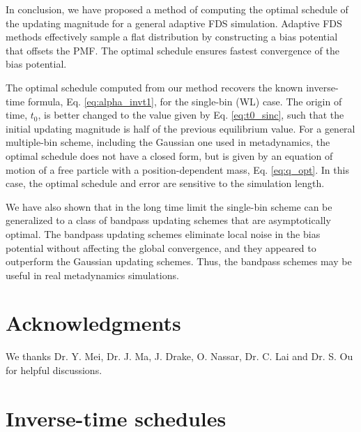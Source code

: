 \documentclass[reprint, floatfix]{revtex4-1}
\begin{document}
In conclusion,
we have proposed a method of computing
the optimal schedule of the updating magnitude
for a general adaptive FDS simulation.
%
Adaptive FDS methods
effectively sample a flat distribution
by constructing a bias potential
that offsets the PMF.
%
The optimal schedule ensures fastest convergence
of the bias potential.


The optimal schedule computed from our method
recovers the known inverse-time formula,
Eq. \eqref{eq:alpha_invt1},
for the single-bin (WL) case.
%
The origin of time, $t_0$, is better changed
to the value given by Eq. \eqref{eq:t0_sinc},
such that the initial updating magnitude
is half of the previous equilibrium value.
%
For a general multiple-bin scheme,
including the Gaussian one used in metadynamics,
the optimal schedule does not have a closed form,
but is given by an equation of motion
of a free particle with a position-dependent mass, Eq. \eqref{eq:q_opt}.
%
In this case,
the optimal schedule and error
are sensitive to the simulation length.


We have also shown that in the long time limit
the single-bin scheme can be generalized
to a class of bandpass updating schemes that are
asymptotically optimal.
%
The bandpass updating schemes
eliminate local noise in the bias potential
without affecting the global convergence,
and they appeared to outperform
the Gaussian updating schemes.
%
Thus, the bandpass schemes
may be useful in real metadynamics simulations.
%



\section{Acknowledgments}

We thanks
Dr. Y. Mei, Dr. J. Ma,
J. Drake, O. Nassar, Dr. C. Lai and Dr. S. Ou
for helpful discussions.


\appendix





\section{\label{sec:invt_schedule}
Inverse-time schedules}
\end{document}
